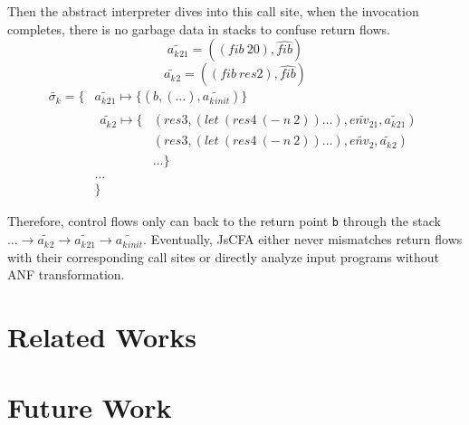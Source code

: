\documentclass{article}
\begin{document}
Then the abstract interpreter dives into this call site, when the invocation completes, there is no garbage data in stacks to confuse return flows.
\[
\widetilde{a_k{}_{21}} = ((fib\ 20), \widehat{fib})
\]
\[
\widetilde{a_k{}_{2}} = ((fib\ res2), \widehat{fib})
\]
\[
\begin{aligned}
\widetilde{\sigma_k} = \{
                          {}& \widetilde{a_k{}_{21}} \mapsto \{(b, (\dots), \widetilde{a_k{}_{init}}) \} {}\\
                            &
                            \begin{aligned}
                              \widetilde{a_k{}_{2}} \mapsto
                              \{{}& (res3, (let\ (res4\ (-\ n\ 2)) \dots), \widetilde{env_{21}}, \widetilde{a_k{}_{21}}) {}\\
                              & (res3, (let\ (res4\ (-\ n\ 2)) \dots), \widetilde{env_2}, \widetilde{a_k{}_{2}}) {} \\
                              & \dots
                              \}
                            \end{aligned} {}\\
                            & \dots {}\\
                            & \}
\end{aligned}
\]

Therefore, control flows only can back to the return point \verb|b| through the stack $\dots \to \widetilde{a_k{}_{2}} \to \widetilde{a_k{}_{21}} \to \widetilde{a_k{}_{init}}$. Eventually, JsCFA either never mismatches return flows with their corresponding call sites or directly analyze input programs without ANF transformation.

\section{Related Works}
\label{sec:Related Works}

\section{Future Work}
\label{sec:Future Work}
\end{document}
